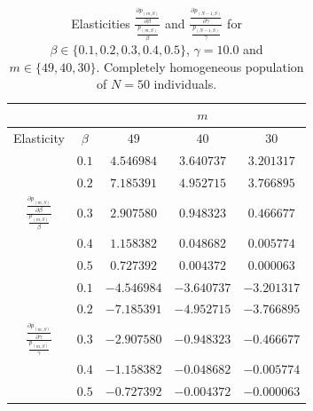 \documentclass[10pt,A4paper]{article}
\begin{document}
\begin{table}[h]
\centering
\begin{tabular}{|c|c|c|c|c|}
\hline
 &  &  & $m$ & \\
\hline
Elasticity & $\beta$ & $49$ & $40$ & $30$ \\
\hline
 & $0.1$ & $4.546984$ & $3.640737$ & $3.201317$ \\
\cline{2-5}
 & $0.2$ & $7.185391$ & $4.952715$ & $3.766895$ \\
\cline{2-5}
$\frac{\frac{\partial  p_{(m,S)}}{\partial \beta}}{\frac{p_{(m,S)}}{\beta}}$ & $0.3$ & $2.907580$ & $0.948323$ & $0.466677$ \\
\cline{2-5}
& $0.4$ & $1.158382$ & $0.048682$ & $0.005774$ \\
\cline{2-5}
& $0.5$ & $0.727392$ & $0.004372$ & $0.000063$ \\
\hline
 & $0.1$ & $-4.546984$ & $-3.640737$ & $-3.201317$ \\
\cline{2-5}
 & $0.2$ & $-7.185391$ & $-4.952715$ & $-3.766895$ \\
\cline{2-5}
$\frac{\frac{\partial  p_{(m,S)}}{\partial \gamma}}{\frac{p_{(m,S)}}{\gamma}}$ & $0.3$ & $-2.907580$ & $-0.948323$ & $-0.466677$ \\
\cline{2-5}
& $0.4$ & $-1.158382$ & $-0.048682$ & $-0.005774$ \\
\cline{2-5}
& $0.5$ & $-0.727392$ & $-0.004372$ & $-0.000063$ \\
\hline
\end{tabular}
\caption{Elasticities $\frac{\frac{\partial p_{(m,S)}}{\partial \beta}}{\frac{p_{(m,S)}}{\beta}}$ and $\frac{\frac{\partial p_{(N-1,S)}}{\partial \gamma}}{\frac{p_{(N-1,S)}}{\gamma}}$ for
$\beta\in\{0.1,0.2,0.3,0.4,0.5\}$, $\gamma=10.0$ and $m\in\{49,40,30\}$. Completely homogeneous population of $N=50$ individuals.}
\label{tab:3bis}
\end{table}
\end{document}
